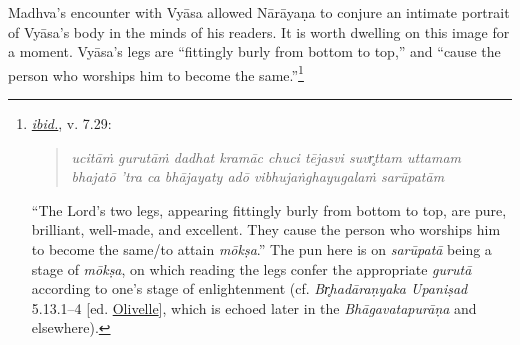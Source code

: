 Madhva’s encounter with Vyāsa allowed Nārāyaṇa to conjure an intimate portrait of Vyāsa’s body in the minds of his readers. It is worth dwelling on this image for a moment. Vyāsa’s legs are “fittingly burly from bottom to top,” and “cause the person who worships him to become the same.”\footnote{%
\hyperref[NarayanaPandita2017]{\emph{ibid.}}, v. 7.29:\setlength{\parindent}{2em}

\vspace{-1.5ex}\begin{quote}\raggedright
      \emph{ucitāṁ gurutāṁ dadhat kramāc chuci tējasvi suvr̥ttam uttamam}\\
\emph{bhajatō ’tra ca bhājayaty adō vibhujaṅghayugalaṁ sarūpatām}\end{quote}\vspace{-1.5ex}
      

\noindent{}“The Lord’s two legs, appearing fittingly burly from bottom to top, are pure, brilliant, well-made, and excellent. They cause the person who worships him to become the same/to attain \emph{mōkṣa}.” The pun here is on \emph{sarūpatā} being a stage of \emph{mōkṣa}, on which reading the legs confer the appropriate \emph{gurutā} according to one’s stage of enlightenment (cf. \emph{{Br̥hadāraṇyaka Upaniṣad}} 5.13.1–4 [ed. \hyperref[Olivelle1998]{Olivelle}], which is echoed later in the \emph{{Bhāgavatapurāṇa}} and elsewhere).
}
